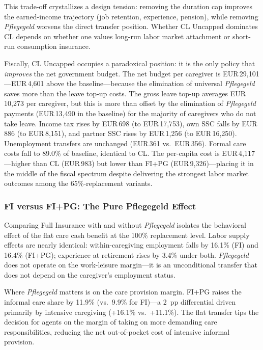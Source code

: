 This trade-off crystallizes a design tension: removing the duration cap improves the earned-income trajectory (job retention, experience, pension), while removing \textit{Pflegegeld} worsens the direct transfer position. Whether CL Uncapped dominates CL depends on whether one values long-run labor market attachment or short-run consumption insurance.

Fiscally, CL Uncapped occupies a paradoxical position: it is the only policy that \textit{improves} the net government budget. The net budget per caregiver is EUR\,29,101---EUR\,4,601 above the baseline---because the elimination of universal \textit{Pflegegeld} saves more than the leave top-up costs. The gross leave top-up averages EUR\,10,273 per caregiver, but this is more than offset by the elimination of \textit{Pflegegeld} payments (EUR\,13,490 in the baseline) for the majority of caregivers who do not take leave. Income tax rises by EUR\,698 (to EUR\,17,753), own SSC falls by EUR\,886 (to EUR\,8,151), and partner SSC rises by EUR\,1,256 (to EUR\,16,250). Unemployment transfers are unchanged (EUR\,361 vs.\ EUR\,356). Formal care costs fall to 89.0\% of baseline, identical to CL. The per-capita cost is EUR\,4,117---higher than CL (EUR\,983) but lower than FI+PG (EUR\,9,326)---placing it in the middle of the fiscal spectrum despite delivering the strongest labor market outcomes among the 65\%-replacement variants.

\subsubsection{FI versus FI+PG: The Pure Pflegegeld Effect}

Comparing Full Insurance with and without \textit{Pflegegeld} isolates the behavioral effect of the flat care cash benefit at the 100\% replacement level. Labor supply effects are nearly identical: within-caregiving employment falls by 16.1\% (FI) and 16.4\% (FI+PG); experience at retirement rises by 3.4\% under both. \textit{Pflegegeld} does not operate on the work-leisure margin---it is an unconditional transfer that does not depend on the caregiver's employment status.

Where \textit{Pflegegeld} matters is on the care provision margin. FI+PG raises the informal care share by 11.9\% (vs.\ 9.9\% for FI)---a 2~pp differential driven primarily by intensive caregiving (+16.1\% vs.\ +11.1\%). The flat transfer tips the decision for agents on the margin of taking on more demanding care responsibilities, reducing the net out-of-pocket cost of intensive informal provision.


